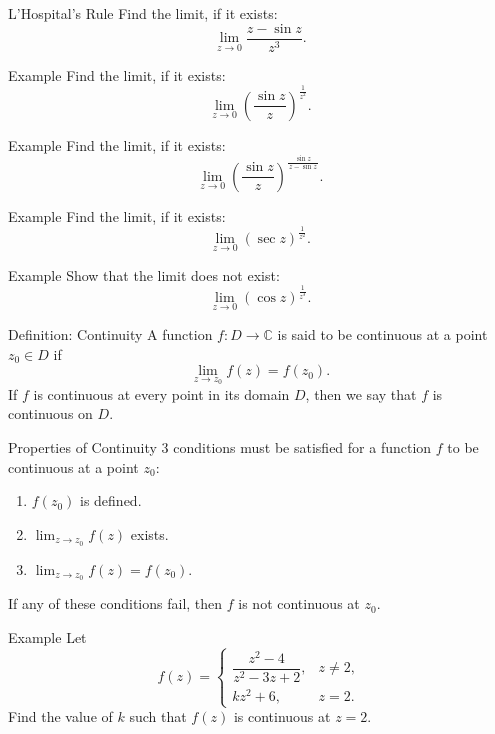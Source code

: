 \documentclass[11pt]{beamer}
\theoremstyle{plain}
\begin{document}
\begin{frame}{L'Hospital's Rule}
Find the limit, if it exists:
\[
\lim_{z\to 0}\frac{z-\sin z}{z^3}.
\]
\end{frame}

\begin{frame}{Example}
Find the limit, if it exists:
\[
\lim_{z\to 0}\left(\frac{\sin z}{z}\right)^{\frac{1}{z^2}}.
\]
\end{frame}

\begin{frame}{Example}
Find the limit, if it exists:
\[
\lim_{z\to 0}\left(\frac{\sin z}{z}\right)^{\frac{\sin z}{\,z-\sin z\,}}.
\]
\end{frame}

\begin{frame}{Example}
Find the limit, if it exists:
\[
\lim_{z\to 0} (\sec z)^{\frac{1}{z^2}}.
\]
\end{frame}
\begin{frame}{Example}
Show that the limit does not exist:
\[
\lim_{z\to 0} (\cos z)^{\frac{1}{z^3}}.
\]
\end{frame}

\begin{frame}{Definition: Continuity}
A function $f : D \to \mathbb{C}$ is said to be continuous at a point $z_0 \in D$ if
\[
\lim_{z\to z_0} f(z) = f(z_0).
\]
If $f$ is continuous at every point in its domain $D$, then we say that $f$ is
continuous on $D$.
\end{frame}

\begin{frame}{Properties of Continuity}
$3$ conditions must be satisfied for a function $f$ to be continuous at a point $z_0$:
\begin{enumerate}
  \item $f(z_0)$ is defined.
  \item $\displaystyle \lim_{z\to z_0} f(z)$ exists.
  \item $\displaystyle \lim_{z\to z_0} f(z)=f(z_0)$.
\end{enumerate}
If any of these conditions fail, then $f$ is not continuous at $z_0$.
\end{frame}

\begin{frame}{Example}
Let
\[
f(z)=
\begin{cases}
\dfrac{z^2-4}{z^2-3z+2}, & z\neq 2,\\[6pt]
kz^2+6, & z=2.
\end{cases}
\]
Find the value of $k$ such that $f(z)$ is continuous at $z=2$.
\end{frame}
\end{document}
